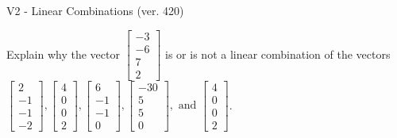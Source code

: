 \begin{exercise}
  \begin{exerciseTitle}V2 - Linear Combinations (ver. 420)\end{exerciseTitle}
  \begin{exerciseStatement}
    Explain why the vector \(\left[\begin{array}{c}
-3 \\
-6 \\
7 \\
2
\end{array}\right]\)  is or is not a linear 
	combination of the vectors \(\left[\begin{array}{c}
2 \\
-1 \\
-1 \\
-2
\end{array}\right] , \left[\begin{array}{c}
4 \\
0 \\
0 \\
2
\end{array}\right] , \left[\begin{array}{c}
6 \\
-1 \\
-1 \\
0
\end{array}\right] , \left[\begin{array}{c}
-30 \\
5 \\
5 \\
0
\end{array}\right] , \text{ and } \left[\begin{array}{c}
4 \\
0 \\
0 \\
2
\end{array}\right]\).
	



\end{exerciseStatement}
\end{exercise}

